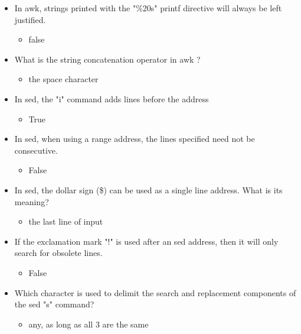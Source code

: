 \documentclass{report}
\begin{document}
\begin{itemize}
        \item In awk, strings printed with the "\%20s" printf directive will always be left justified.
            \begin{itemize}
                \item false
            \end{itemize}
        \item What is the string concatenation operator in awk ?
            \begin{itemize}
                \item the space character
            \end{itemize}
    \end{itemize}

    \pagebreak 
    \begin{itemize}
        \item In sed, the "i" command adds lines before the address
            \begin{itemize}
                \item True
            \end{itemize}
        \item In sed, when using a range address, the lines specified need not be consecutive.
            \begin{itemize}
                \item False
            \end{itemize}
        \item In sed, the dollar sign (\$) can be used as a single line address. What is its meaning?
            \begin{itemize}
                \item the last line of input
            \end{itemize}
        \item If the exclamation mark "!" is used after an sed address, then it will only search for obsolete lines.
            \begin{itemize}
                \item False
            \end{itemize}
        \item Which character is used to delimit the search and replacement components of the sed "s" command?
            \begin{itemize}
                \item any, as long as all 3 are the same
            \end{itemize}

\end{itemize}
\end{document}
